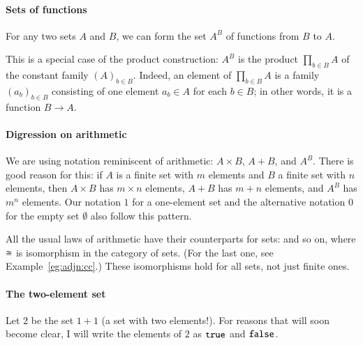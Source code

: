 \paragraph*{Sets of functions}  
%
%
%
For any two sets $A$ and $B$, we can form the set $A^B$%
%
%
 of functions from $B$ to $A$.  

This is a special case of the product construction: $A^B$ is the product
$\prod_{b \in B} A$ of the constant family $(A)_{b \in B}$.  Indeed, an
element of $\prod_{b \in B} A$ is a family $(a_b)_{b \in B}$ consisting of
one element $a_b \in A$ for each $b \in B$; in other words, it is a function
$B \to A$.

\paragraph*{Digression on arithmetic}%
\label{p:arith}
%
% 
We are using notation reminiscent of arithmetic: $A \times B$, $A + B$, and
$A^B$.  There is good reason for this: if $A$ is a finite set with $m$
elements and $B$ a finite set with $n$ elements, then $A \times B$ has $m
\times n$ elements, $A + B$ has $m + n$ elements, and $A^B$ has $m^n$
elements.  Our notation $1$ for a one-element set and the alternative
notation $0$ for the empty set $\emptyset$ also follow this pattern.

All the usual laws of arithmetic have their counterparts for sets:
% 
% 
and so on, where $\cong$ is isomorphism in the category of sets.  (For the
last one, see Example~\ref{eg:adjn:cc}.)  These isomorphisms hold for all
sets, not just finite ones.

\paragraph*{The two-element set}  
%
%
Let $2$%
%
%
be the set $1 + 1$ (a set with two elements!).  For reasons that will soon
become clear, I will write the elements of $2$ as $\texttt{true}$ and $\texttt{false}$.

